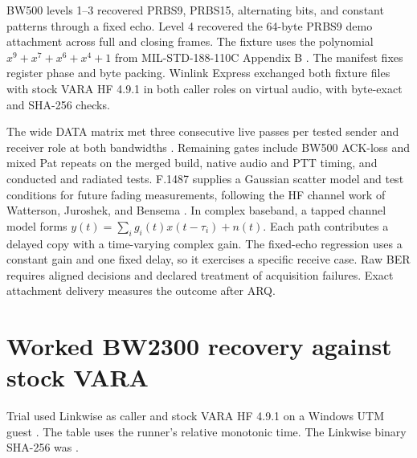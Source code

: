 \documentclass[11pt,letterpaper]{article}
\begin{document}
BW500 levels 1--3 recovered PRBS9, PRBS15, alternating bits, and constant
patterns through a fixed echo. Level 4 recovered the 64-byte PRBS9 demo
attachment across full and closing frames. The fixture uses the polynomial
\(x^9+x^7+x^6+x^4+1\) from MIL-STD-188-110C Appendix B \cite{mil}.
The manifest fixes register phase and byte packing. Winlink Express
exchanged both fixture files with stock VARA HF 4.9.1 in both caller roles
on virtual audio, with byte-exact and SHA-256 checks.

The wide DATA matrix met three consecutive live passes per tested
sender and receiver role at both bandwidths \cite{bench}. Remaining
gates include BW500 ACK-loss and mixed Pat repeats on the merged build,
native audio and PTT timing, and conducted and radiated tests. F.1487
supplies a Gaussian scatter model and test conditions for future fading
measurements, following the HF channel work of Watterson, Juroshek, and
Bensema \cite{watterson,itu}. In complex baseband, a tapped channel model
forms \(y(t)=\sum_i g_i(t)x(t-\tau_i)+n(t)\). Each path contributes a
delayed copy with a time-varying complex gain. The fixed-echo regression
uses a constant gain and one fixed delay, so it exercises a specific
receive case. Raw BER requires aligned decisions and declared
treatment of acquisition failures. Exact attachment delivery measures
the outcome after ARQ.

\appendix


\section{Worked BW2300 recovery against stock VARA}
Trial  used Linkwise as caller and stock VARA HF 4.9.1
on a Windows UTM guest \cite{bench}. The table uses the runner's relative
monotonic time. The Linkwise binary SHA-256 was
.
\end{document}

